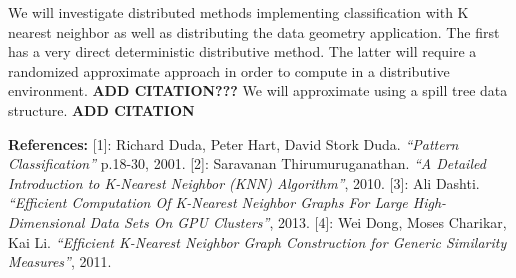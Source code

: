 \vspace{5 mm}
\noindent
We will investigate distributed methods implementing classification with 
K nearest neighbor as well as distributing the data geometry application. The 
first has a very direct deterministic distributive method. The latter will 
require a randomized approximate approach in order to compute in a distributive 
environment.
\textbf{ADD CITATION???} 
We will approximate using a spill tree data structure.
\textbf{ADD CITATION}


\textbf{References:}
[1]: Richard Duda, Peter Hart, David Stork Duda. 
\textit{``Pattern Classification''} p.18-30, 2001.
[2]: Saravanan Thirumuruganathan. 
\textit{``A Detailed Introduction to K-Nearest Neighbor (KNN) Algorithm''}, 2010. 
[3]: Ali Dashti. 
\textit{``Efficient Computation Of K-Nearest Neighbor Graphs For Large 
High-Dimensional Data Sets On GPU Clusters''}, 2013.
[4]: Wei Dong, Moses Charikar, Kai Li. 
\textit{``Efﬁcient K-Nearest Neighbor Graph Construction for Generic 
Similarity Measures''}, 2011.
